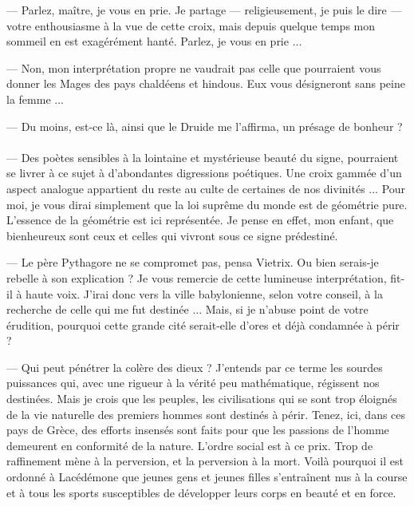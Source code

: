 \documentclass[a4paper, 11pt, oneside, polutonikogreek, french]{article}
\begin{document}
--- Parlez, maître, je vous en prie. Je partage --- religieusement, je puis le dire --- votre enthousiasme à la vue de cette croix, mais depuis quelque temps mon sommeil en est exagérément hanté. Parlez, je vous en prie ...

--- Non, mon interprétation propre ne vaudrait pas celle que pourraient vous donner les Mages des pays chaldéens et hindous. Eux vous désigneront sans peine la femme ...

--- Du moins, est-ce là, ainsi que le Druide me l'affirma, un présage de bonheur ?
\clearpage
\paragraph{}
--- Des poètes sensibles à la lointaine et mystérieuse beauté du signe, pourraient se livrer à ce sujet à d'abondantes digressions poétiques. Une croix gammée d'un aspect analogue appartient du reste au culte de certaines de nos divinités ... Pour moi, je vous dirai simplement que la loi suprême du monde est de géométrie pure. L'essence de la géométrie est ici représentée. Je pense en effet, mon enfant, que bienheureux sont ceux et celles qui vivront sous ce signe prédestiné.

\bigskip
\centerline{\EightStarTaper}
\centerline{\EightStarTaper\EightStarTaper}
\bigskip

--- Le père Pythagore ne se compromet pas, pensa Vietrix. Ou bien serais-je rebelle à son explication ? Je vous remercie de cette lumineuse interprétation, fit-il à haute voix. J'irai donc vers la ville babylonienne, selon votre conseil, à la recherche de celle qui me fut destinée ... Mais, si je n'abuse point de votre érudition, pourquoi cette grande cité serait-elle d'ores et déjà condamnée à périr ?

--- Qui peut pénétrer la colère des dieux ? J'entends par ce terme les sourdes puissances qui, avec une rigueur à la vérité peu mathématique, régissent nos destinées. Mais je crois que les peuples, les civilisations qui se sont trop éloignés de la vie naturelle des premiers hommes sont destinés à périr. Tenez, ici, dans ces pays de Grèce, des efforts insensés sont faits pour que les passions de l'homme demeurent en conformité de la nature. L'ordre social est à ce prix. Trop de raffinement mène à la perversion, et la perversion à la mort. Voilà pourquoi il est ordonné à Lacédémone que jeunes gens et jeunes filles s'entraînent nus à la course et à tous les sports susceptibles de développer leurs corps en beauté et en force.
\end{document}
